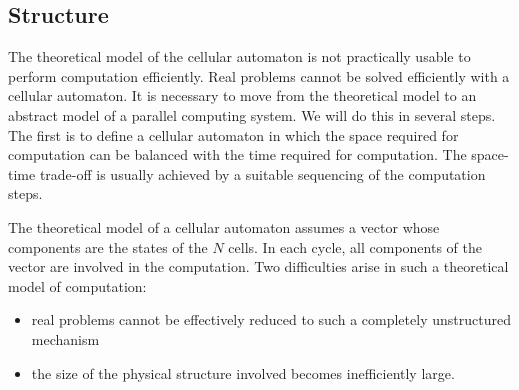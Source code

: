 \subsection{Structure}

The theoretical model of the cellular automaton is not practically usable to perform computation efficiently. Real problems cannot be solved efficiently with a cellular automaton. It is necessary to move from the theoretical model to an abstract model of a parallel computing system. We will do this in several steps. The first is to define a cellular automaton in which the space required for computation can be balanced with the time required for computation. The space-time trade-off is usually achieved by a suitable sequencing of the computation steps.

The theoretical model of a cellular automaton assumes a vector whose components are the states of the $N$ cells. In each cycle, all components of the vector are involved in the computation. Two difficulties arise in such a theoretical model of computation:
\begin{itemize}
    \item real problems cannot be effectively reduced to such a completely unstructured mechanism
    \item the size of the physical structure involved becomes inefficiently large.
\end{itemize}


